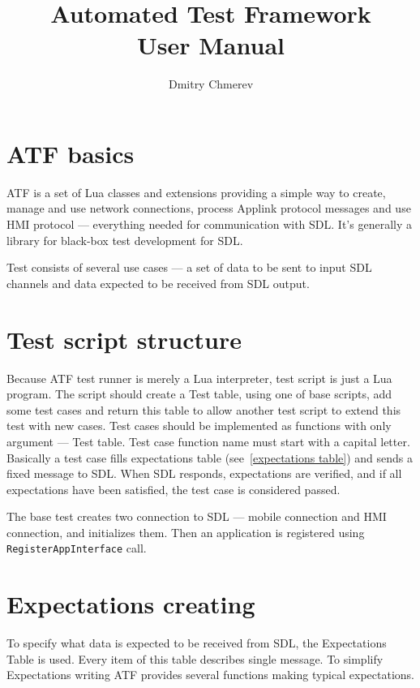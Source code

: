 \documentclass{article}
\title{Automated Test Framework \\ \vspace{2mm} \large User Manual}
\author{Dmitry Chmerev}
\begin{document}
\begin{titlepage}
\maketitle
\end{titlepage}

\tableofcontents
\clearpage

\section{ATF basics}
ATF is a set of Lua classes and extensions providing a simple way to create,
manage and use network connections, process Applink protocol messages
and use HMI protocol --- everything needed for communication with SDL.
It's generally a library for black-box test development for SDL.

Test consists of several use cases --- a set of data to be sent to input
SDL channels and data expected to be received from SDL output.

\section{Test script structure}
Because ATF test runner is merely a Lua interpreter, test script is just
a Lua program.
The script should create a Test table, using one of base scripts,
add some test cases and return this table to allow another test script
to extend this test with new cases.
Test cases should be implemented as functions with only argument --- Test
table.
Test case function name must start with a capital letter.
Basically a test case fills expectations table (see~\ref{expectations table})
and sends a fixed message to SDL.
When SDL responds, expectations are verified, and if all expectations have
been satisfied, the test case is considered passed.

The base test creates two connection to SDL --- mobile connection and HMI
connection, and initializes them.
Then an application is registered using {\tt RegisterAppInterface} call.

\section{Expectations creating}
To specify what data is expected to be received from SDL, the Expectations
Table\label{expectations table} is used.
Every item of this table describes single message.
To simplify Expectations writing ATF provides several functions making typical
expectations.
\end{document}
